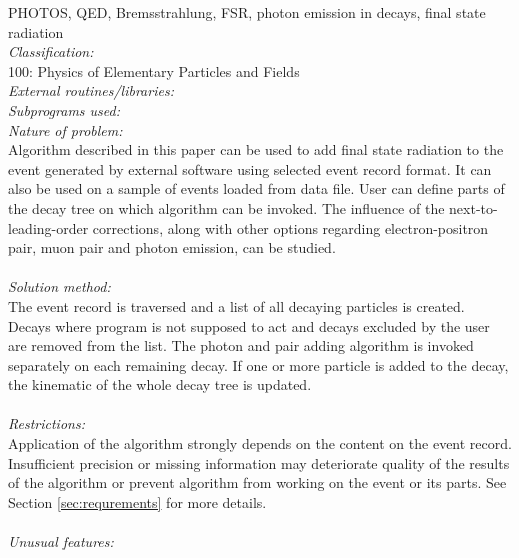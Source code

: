 \begin{small}
PHOTOS, QED, Bremsstrahlung, FSR, photon emission in decays, final state radiation \\
{\em Classification:}                                         \\
100: Physics of Elementary Particles and Fields \\
{\em External routines/libraries:}                            \\
{\em Subprograms used:}                                       \\
{\em Nature of problem:}\\
Algorithm described in this paper can be used to add final state radiation
to the event generated by external software using selected event record format.
It can also be used on a sample of events loaded from data file.
User can define parts of the decay tree on which algorithm can be invoked.
The influence of the next-to-leading-order corrections, along with other
options regarding electron-positron pair, muon pair and photon emission, can be studied. \\
   \\
{\em Solution method:}\\
The event record is traversed and a list of all decaying particles is created.
Decays where program is not supposed to act and decays excluded by the user
are removed from the list. The photon and pair adding algorithm is invoked
separately on each remaining decay. If one or more particle is added to the
decay, the kinematic of the whole decay tree is updated. \\
  \\
{\em Restrictions:}\\
Application of the algorithm strongly depends on the content on the event
record. Insufficient precision or missing information may deteriorate
quality of the results of the algorithm or prevent algorithm from
working on the event or its parts. See Section \ref{sec:requrements} for more details. \\
   \\
{\em Unusual features:}\\

\end{small}
